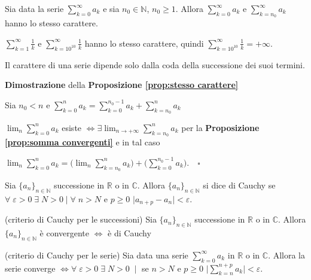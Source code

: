 \begin{proposition}
	\label{prop:stesso carattere}
	Sia data la serie $\sum_{k=0}^\infty a_k$ e sia $n_0\in\mathbb{N}$, $n_0\geq1$. Allora $\sum_{k=0}^\infty a_k$ e $\sum_{k=n_0}^\infty a_k$ hanno lo stesso carattere.
\end{proposition}

\begin{exbar}
	$\sum_{k=1}^\infty \frac{1}{k}$ e $\sum_{k=10^{10}}^\infty \frac{1}{k}$ hanno lo stesso carattere, quindi $\sum_{k=10^{10}}^\infty \frac{1}{k} = +\infty$.
\end{exbar}

\begin{attbar}
	Il carattere di una serie dipende solo dalla coda della successione dei suoi termini.
\end{attbar}

\begin{dembar}
	\textbf{Dimostrazione} della \textbf{Proposizione \ref{prop:stesso carattere}}
	
	Sia $n_0<n$ e $\sum_{k=0}^n a_k = \sum_{k=0}^{n_0-1} a_k + \sum_{k=n_0}^n a_k$
	
	$\lim_{n} \sum_{k=0}^n a_k$ esiste $\iff \exists \lim_{n\rightarrow+\infty} \sum_{k=n_0}^n a_k$ per la \textbf{Proposizione \ref{prop:somma convergenti}} e in tal caso 
	
	$\lim_{n} \sum_{k=0}^n a_k = \bigg(\lim_{n} \sum_{k=n_0}^n a_k \bigg) + \bigg(\sum_{k=0}^{n_0-1}a_k\bigg). \quad \square$
\end{dembar}

\begin{definition}
	Sia $\{a_n\}_{n\in\mathbb{N}}$ successione in $\mathbb{R}$ o in $\mathbb{C}$. Allora $\{a_n\}_{n\in\mathbb{N}}$ si dice di Cauchy se $\forall \; \varepsilon > 0 \; \exists \; N>0 \mid \forall \; n>N$ e $p\geq0$ \quad $\mid a_{n+p} - a_n \mid < \varepsilon$.
\end{definition}

\begin{theorem} (criterio di Cauchy per le successioni)
	Sia $\{a_n\}_{n\in\mathbb{N}}$ successione in $\mathbb{R}$ o in $\mathbb{C}$. Allora $\{a_n\}_{n\in\mathbb{N}}$ è convergente $\iff$ è di Cauchy
\end{theorem}

\begin{theorem} (criterio di Cauchy per le serie)
	\label{th:Cauchy serie}
	Sia data una serie $\sum_{k=0}^\infty a_k$ in $\mathbb{R}$ o in $\mathbb{C}$. Allora la serie converge $\iff \forall \; \varepsilon > 0 \; \exists \; N>0 \; \mid$ se $n>N$ e $p\geq0$ \quad $\biggl| \sum_{k=n}^{n+p} a_k \biggr| < \varepsilon$.
\end{theorem}

